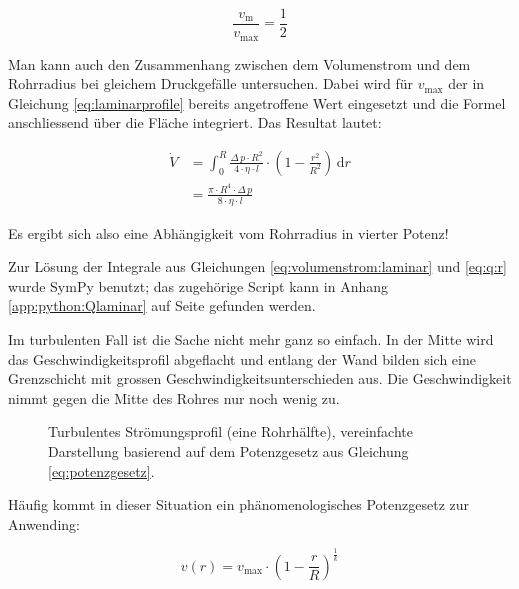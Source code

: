 \begin{equation}
    \label{eq:vm_vmax:laminar}
    \frac{v_{\mathrm{m}}}{v_{\mathrm{max}}} = \frac{1}{2}
\end{equation}

Man kann  auch den Zusammenhang  zwischen dem Volumenstrom und  dem Rohrradius
bei gleichem  Druckgef\"alle untersuchen. Dabei wird  f\"ur $v_{\mathrm{max}}$
der in Gleichung \ref{eq:laminarprofile}  bereits angetroffene Wert eingesetzt
und  die Formel  anschliessend  \"uber die  Fl\"ache integriert. Das  Resultat
lautet:

\begin{equation}
    \label{eq:q:r}
    \begin{split}
        \dot{V} &= \int_{0}^R \frac{\Delta\,p \cdot R^2}{4 \cdot \eta \cdot l} \cdot \left( 1 - \frac{r^2}{R^2} \right) \, \mathrm{d}r \\
                &= \frac{\pi \cdot R^4 \cdot \Delta \, p}{8 \cdot \eta \cdot l}
    \end{split}
\end{equation}

Es ergibt sich also eine Abh\"angigkeit vom Rohrradius in vierter Potenz!

Zur L\"osung  der Integrale aus Gleichungen  \ref{eq:volumenstrom:laminar} und
\ref{eq:q:r}  wurde SymPy  benutzt;  das zugeh\"orige  Script  kann in  Anhang
\ref{app:python:Qlaminar}  auf  Seite  \pageref{app:python:Qlaminar}  gefunden
werden.

Im turbulenten  Fall ist die  Sache nicht mehr  ganz so einfach. In  der Mitte
wird  das  Geschwindigkeitsprofil  abgeflacht  und  entlang  der  Wand  bilden
sich  eine  Grenzschicht  mit grossen  Geschwindigkeitsunterschieden  aus. Die
Geschwindigkeit nimmt gegen die Mitte des Rohres nur noch wenig zu.

\begin{figure}[h!t]
    \centering
    \resizebox{0.8\textwidth}{!}{}
    \caption{%
        Turbulentes   Str\"omungsprofil   (eine  Rohrh\"alfte),   vereinfachte
        Darstellung   basierend    auf   dem   Potenzgesetz    aus   Gleichung
        \ref{eq:potenzgesetz}.
    }
    \label{fig:turbProfile}
\end{figure}

H\"aufig kommt  in dieser Situation ein  ph\"anomenologisches Potenzgesetz zur
Anwending:

\begin{equation}
    \label{eq:potenzgesetz}
    v(r) = v_{\mathrm{max}} \cdot \left( 1 - \frac{r}{R} \right)^{\frac{1}{k}}
\end{equation}

